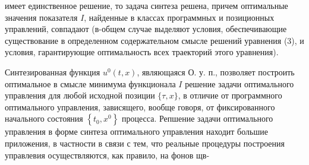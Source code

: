 \documentclass[10pt]{article}
\begin{document}
имеет единственное решение, то задача синтеза решена, причем оптимальные значения показателя $I$, найденные в классах программных и позиционных управлений, совпадают (в-общем случае выделяют условия, обеспечивающие существование в определенном содержательном смысле решений уравнения (3), и условия, гарантирующие оптимальность всех траекторий этого уравнения).

Синтезированная функция $u^{0}(t, x)$, являющаяся О. у. п., позволяет построить оптимальное в смысле минимума функционала $I$ решение задачи оптимального управления для любой исходной позиции $\{\tau, x\}$, в отличие от программного оптимального управления, зависящего, вообще говоря, от фиксированного начального состояния $\left\{t_{0}, x^{0}\right\}$ процесса. Репшение задачи оптимального управления в форме синтеза оптимального управления находит большие приложения, в частности в связи с тем, что реальные процедуры построения управлевия осуществляются, как правило, на фонов щв-
\end{document}
